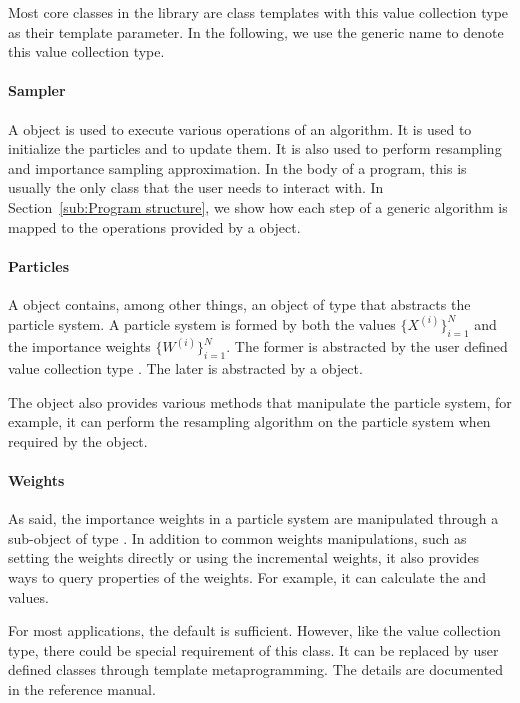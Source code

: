 Most core classes in the library are class templates with this value
collection type as their template parameter. In the following, we use the
generic name  to denote this value collection type.

\paragraph{Sampler}

A  object is used to execute various operations of an
\smc algorithm. It is used to initialize the particles and to update them. It
is also used to perform resampling and importance sampling approximation. In
the body of a program, this is usually the only class that the user needs to
interact with. In Section~\ref{sub:Program structure}, we show how each step
of a generic \smc algorithm is mapped to the operations provided by a
 object.

\paragraph{Particles}

A  object contains, among other things, an object of
type  that abstracts the particle system. A particle
system is formed by both the values $\{X^{(i)}\}_{i=1}^N$ and the importance
weights $\{W^{(i)}\}_{i=1}^N$. The former is abstracted by the user defined
value collection type . The later is abstracted by a
 object.

The  object also provides various methods that
manipulate the particle system, for example, it can perform the resampling
algorithm on the particle system when required by the 
object.

\paragraph{Weights}

As said, the importance weights in a particle system are manipulated through a
sub-object of type . In addition to common weights
manipulations, such as setting the weights directly or using the incremental
weights, it also provides ways to query properties of the weights. For
example, it can calculate the \ess and \cess values.

For most applications, the default  is sufficient.
However, like the value collection type, there could be special requirement of
this class. It can be replaced by user defined classes through \cpp template
metaprogramming. The details are documented in the reference manual.

